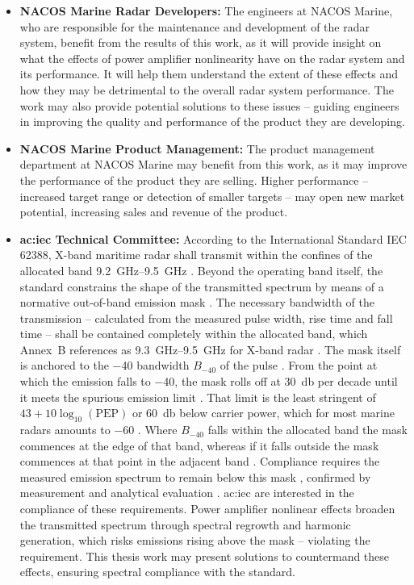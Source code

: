 \begin{itemize}
    \item \textbf{NACOS Marine Radar Developers:} The engineers at NACOS Marine, who are responsible for the maintenance and development of the radar system, benefit from the results of this work, as it will provide insight on what the effects of power amplifier nonlinearity have on the radar system and its performance. It will help them understand the extent of these effects and how they may be detrimental to the overall radar system performance. The work may also provide potential solutions to these issues – guiding engineers in improving the quality and performance of the product they are developing.
    \item \textbf{NACOS Marine Product Management:} The product management department at NACOS Marine may benefit from this work, as it may improve the performance of the product they are selling. Higher performance – increased target range or detection of smaller targets – may open new market potential, increasing sales and revenue of the product. 
    \item \textbf{\gls{ac:iec} Technical Committee:} According to the International Standard IEC 62388, X-band maritime radar shall transmit within the confines of the allocated band \qtyrange{9.2}{9.5}{\giga\hertz} \cite[Sec.~6.2.1.1]{iec}. Beyond the operating band itself, the standard constrains the shape of the transmitted spectrum by means of a normative out-of-band emission mask \cite[Annex~B]{iec}. The necessary bandwidth of the transmission -- calculated from the measured pulse width, rise time and fall time -- shall be contained completely within the allocated band, which Annex~B references as \qtyrange{9.3}{9.5}{\giga\hertz} for X-band radar \cite[Sec.~B.2 and Sec.~B.5.1]{iec}. The mask itself is anchored to the \qty{-40}{\dBc} bandwidth $B_{-40}$ of the pulse \cite[Sec.~B.4.2]{iec}. From the point at which the emission falls to \qty{-40}{\dBc}, the mask rolls off at \qty{30}{\decibel} per decade until it meets the spurious emission limit \cite[Sec.~B.2]{iec}. That limit is the least stringent of $43 + 10\log_{10}(\mathrm{PEP})$ or \qty{60}{\decibel} below carrier power, which for most marine radars amounts to \qty{-60}{\dBc} \cite[Sec.~B.2]{iec}. Where $B_{-40}$ falls within the allocated band the mask commences at the edge of that band, whereas if it falls outside the mask commences at that point in the adjacent band \cite[Fig.~B.1 and Fig.~B.2]{iec}. Compliance requires the measured emission spectrum to remain below this mask \cite[Sec.~B.5.3]{iec}, confirmed by measurement and analytical evaluation \cite[Sec.~6.2.1.2]{iec}. \gls{ac:iec} are interested in the compliance of these requirements. Power amplifier nonlinear effects broaden the transmitted spectrum through spectral regrowth and harmonic generation, which risks emissions rising above the mask -- violating the requirement. This thesis work may present solutions to countermand these effects, ensuring spectral compliance with the standard.

\end{itemize}

